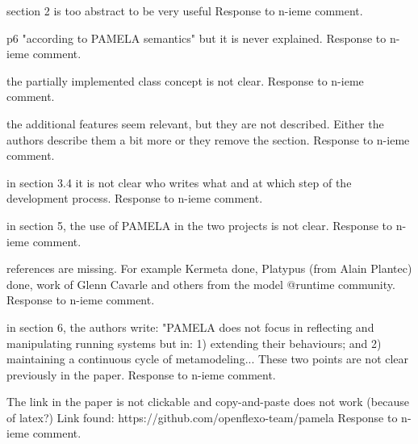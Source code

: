 \documentclass[10pt]{article}
\begin{document}
\begin{response}{section 2 is too abstract to be very useful}
  Response to n-ieme comment.
\end{response}

\begin{response}{p6 "according to PAMELA semantics" but it is never explained.}
  Response to n-ieme comment.
\end{response}

\begin{response}{the partially implemented class concept is not clear.}
  Response to n-ieme comment.
\end{response}

\begin{response}{the additional features seem relevant, but they are not described. Either the authors describe them a bit more or they remove the section.}
  Response to n-ieme comment.
\end{response}


\begin{response}{in section 3.4 it is not clear who writes what and at which step of the development process.}
  Response to n-ieme comment.
\end{response}

\begin{response}{in section 5, the use of PAMELA in the two projects is not clear.}
  Response to n-ieme comment.
\end{response}

\begin{response}{references are missing. For example Kermeta done, Platypus (from Alain Plantec) done, work of Glenn Cavarle and others from the model @runtime community.}
  Response to n-ieme comment.
\end{response}


\begin{response}{in section 6, the authors write: "PAMELA does not focus in reflecting and manipulating running systems but in: 1) extending their behaviours; and 2) maintaining a continuous cycle of metamodeling... These two points are not clear previously in the paper.
}
  Response to n-ieme comment.
\end{response}



\begin{response}{The link in the paper is not clickable and copy-and-paste does not work (because of latex?) Link found: https://github.com/openflexo-team/pamela}
  Response to n-ieme comment.
\end{response}
\end{document}
